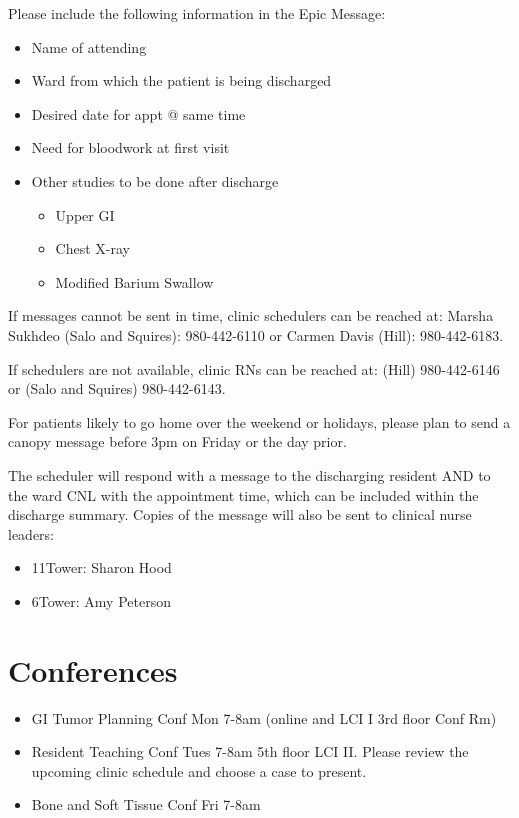 \documentclass[
]{book}
\providecommand{\tightlist}{%
  \setlength{\itemsep}{0pt}\setlength{\parskip}{0pt}}
\begin{document}
Please include the following information in the Epic Message:

\begin{itemize}
\tightlist
\item
  Name of attending
\item
  Ward from which the patient is being discharged
\item
  Desired date for appt @ same time
\item
  Need for bloodwork at first visit
\item
  Other studies to be done after discharge

  \begin{itemize}
  \tightlist
  \item
    Upper GI
  \item
    Chest X-ray
  \item
    Modified Barium Swallow
  \end{itemize}
\end{itemize}

If messages cannot be sent in time, clinic schedulers can be reached at: Marsha Sukhdeo (Salo and Squires): 980-442-6110 or Carmen Davis (Hill): 980-442-6183.

If schedulers are not available, clinic RNs can be reached at: (Hill) 980-442-6146 or (Salo and Squires) 980-442-6143.

For patients likely to go home over the weekend or holidays, please plan to send a canopy message before 3pm on Friday or the day prior.

The scheduler will respond with a message to the discharging resident AND to the ward CNL with the appointment time, which can be included within the discharge summary. Copies of the message will also be sent to clinical nurse leaders:

\begin{itemize}
\tightlist
\item
  11Tower: Sharon Hood
\item
  6Tower: Amy Peterson
\end{itemize}

\hypertarget{conferences}{%
\section{Conferences}\label{conferences}}

\begin{itemize}
\tightlist
\item
  GI Tumor Planning Conf Mon 7-8am (online and LCI I 3rd floor Conf Rm)
\item
  Resident Teaching Conf Tues 7-8am 5th floor LCI II. Please review the upcoming clinic schedule and choose a case to present.
\item
  Bone and Soft Tissue Conf Fri 7-8am
\end{itemize}
\end{document}
